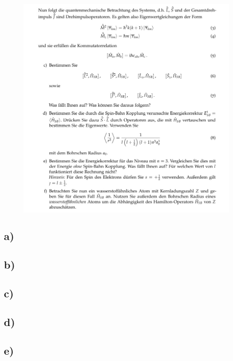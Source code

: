     \begin{figure}[H]
        \centering
        \includegraphics[width=\textwidth]{images/Aufgabe1b.jpg}
        \label{fig:2}
    \end{figure}

    \subsection{a)}

    \subsection{b)}

    \subsection{c)}

    \subsection{d)}

    \subsection{e)}

